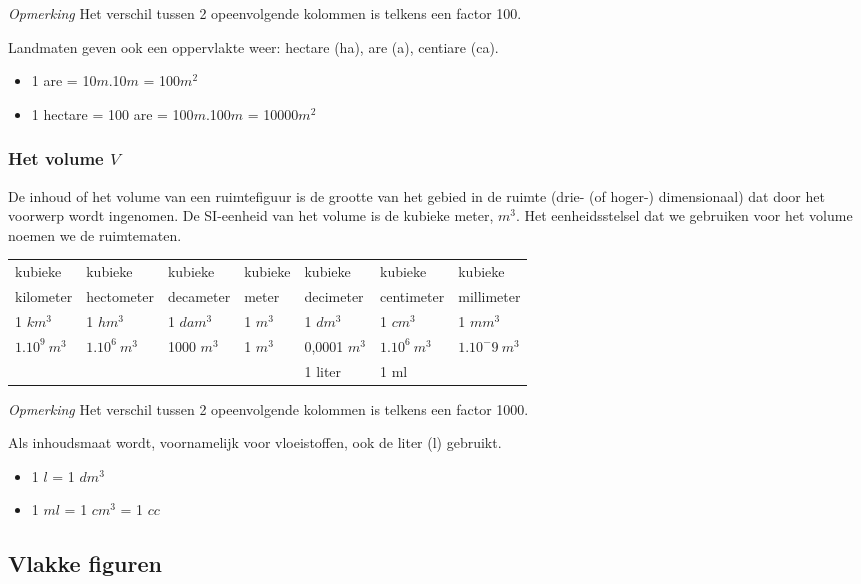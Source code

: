 \emph{Opmerking}			
Het verschil tussen 2 opeenvolgende kolommen is telkens een factor 100.

Landmaten geven ook een oppervlakte weer: hectare (ha), are (a), centiare (ca).
\begin{itemize}
	\item 1 are = 10$m$.10$m$ = 100$m^2$
	\item 1 hectare = 100 are = 100$m$.100$m$ = 10000$m^2$
\end{itemize}

\subsubsection{Het volume $V$}
De inhoud of het volume van een ruimtefiguur is de grootte van het gebied in de ruimte (drie- (of hoger-) dimensionaal) dat door het voorwerp wordt ingenomen. De SI-eenheid van het volume is de kubieke meter, $m^3$. Het eenheidsstelsel dat we gebruiken voor het volume noemen we de ruimtematen.


\begin{center}
	\begin{tabular}{lllllll}
		kubieke & kubieke & kubieke & kubieke & kubieke & kubieke & kubieke \\
		kilometer & hectometer & decameter & meter & decimeter & centimeter & millimeter \\
		\hline
		1 $km^3$ & 1 $hm^3$ & 1 $dam^3$ & 1 $m^3$ & 1 $dm^3$ & 1 $cm^3$ & 1 $mm^3$ \\
		$1.10^9~ m^3$ & $1.10^6~ m^3$ & 1000 $m^3$ & 1 $m^3$ & 0,0001 $m^3$ & $1.10^6~ m^3$ & $1.10^-9 ~m^3$ \\
		&  &  &  & 1 liter & 1 ml & 
	\end{tabular}
\end{center}

\emph{Opmerking}
Het verschil tussen 2 opeenvolgende kolommen is telkens een factor 1000.

Als inhoudsmaat wordt, voornamelijk voor vloeistoffen, ook de liter (l) gebruikt.

\begin{itemize}
	\item 1 $l$ = 1 $dm^3$
	\item 1 $ml$ = 1 $cm^3$ = 1 $cc$
\end{itemize}

\subsection{Vlakke figuren}

